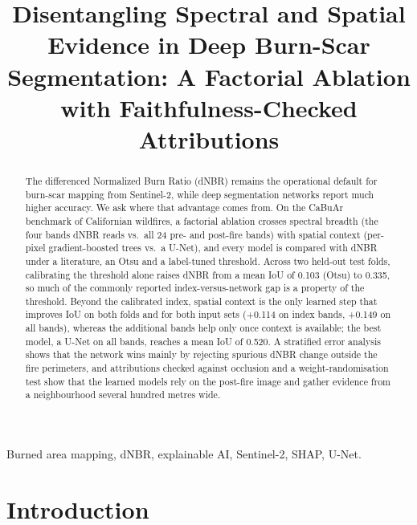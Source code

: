 \documentclass[conference]{IEEEtran}
\begin{document}
\title{Disentangling Spectral and Spatial Evidence in Deep Burn-Scar Segmentation: A Factorial Ablation with Faithfulness-Checked Attributions}

\author{
}

\maketitle

\begin{abstract}
The differenced Normalized Burn Ratio (dNBR) remains the operational default for burn-scar mapping from Sentinel-2, while deep segmentation networks report much higher accuracy. We ask where that advantage comes from. On the CaBuAr benchmark of Californian wildfires, a factorial ablation crosses spectral breadth (the four bands dNBR reads vs.\ all 24 pre- and post-fire bands) with spatial context (per-pixel gradient-boosted trees vs.\ a U-Net), and every model is compared with dNBR under a literature, an Otsu and a label-tuned threshold. Across two held-out test folds, calibrating the threshold alone raises dNBR from a mean IoU of 0.103 (Otsu) to 0.335, so much of the commonly reported index-versus-network gap is a property of the threshold. Beyond the calibrated index, spatial context is the only learned step that improves IoU on both folds and for both input sets (+0.114 on index bands, +0.149 on all bands), whereas the additional bands help only once context is available; the best model, a U-Net on all bands, reaches a mean IoU of 0.520. A stratified error analysis shows that the network wins mainly by rejecting spurious dNBR change outside the fire perimeters, and attributions checked against occlusion and a weight-randomisation test show that the learned models rely on the post-fire image and gather evidence from a neighbourhood several hundred metres wide.
\end{abstract}

\begin{IEEEkeywords}
Burned area mapping, dNBR, explainable AI, Sentinel-2, SHAP, U-Net.
\end{IEEEkeywords}

\section{Introduction}
\end{document}
